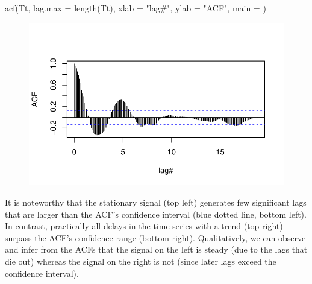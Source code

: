 \documentclass[
  letterpaper,
  DIV=11,
  numbers=noendperiod]{scrartcl}
\newenvironment{Shaded}{\begin{snugshade}}{\end{snugshade}}
\newcommand{\AttributeTok}[1]{\textcolor[rgb]{0.40,0.45,0.13}{#1}}
\newcommand{\DecValTok}[1]{\textcolor[rgb]{0.68,0.00,0.00}{#1}}
\newcommand{\FunctionTok}[1]{\textcolor[rgb]{0.28,0.35,0.67}{#1}}
\newcommand{\NormalTok}[1]{\textcolor[rgb]{0.00,0.23,0.31}{#1}}
\newcommand{\OtherTok}[1]{\textcolor[rgb]{0.00,0.23,0.31}{#1}}
\newcommand{\SpecialCharTok}[1]{\textcolor[rgb]{0.37,0.37,0.37}{#1}}
\newcommand{\StringTok}[1]{\textcolor[rgb]{0.13,0.47,0.30}{#1}}
\begin{document}
\begin{Shaded}
\begin{Highlighting}[]
\FunctionTok{acf}\NormalTok{(Tt, }\AttributeTok{lag.max =} \FunctionTok{length}\NormalTok{(Tt),}
    \AttributeTok{xlab =} \StringTok{"lag\#"}\NormalTok{, }\AttributeTok{ylab =} \StringTok{"ACF"}\NormalTok{, }\AttributeTok{main =} \StringTok{\textquotesingle{}\textquotesingle{}}\NormalTok{)}
\end{Highlighting}
\end{Shaded}

\begin{figure}[H]

{\centering \includegraphics{Quarto_files/figure-pdf/unnamed-chunk-17-4.pdf}

}

\end{figure}

It is noteworthy that the stationary signal (top left) generates few
significant lags that are larger than the ACF's confidence interval
(blue dotted line, bottom left). In contrast, practically all delays in
the time series with a trend (top right) surpass the ACF's confidence
range (bottom right). Qualitatively, we can observe and infer from the
ACFs that the signal on the left is steady (due to the lags that die
out) whereas the signal on the right is not (since later lags exceed the
confidence interval).

\begin{Shaded}
\end{Shaded}
\end{document}
